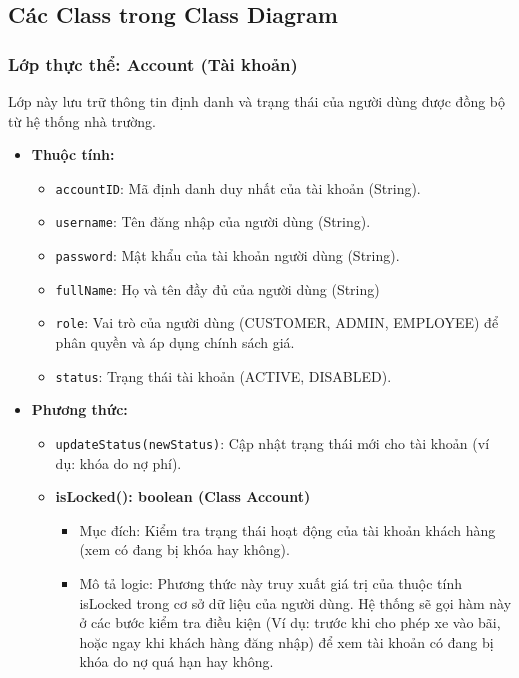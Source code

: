 \subsection{Các Class trong Class Diagram}
\subsubsection{Lớp thực thể: Account (Tài khoản)}
Lớp này lưu trữ thông tin định danh và trạng thái của người dùng được đồng bộ từ hệ thống nhà trường.

\begin{itemize}
    \item \textbf{Thuộc tính:}
    \begin{itemize}
        \item \texttt{accountID}: Mã định danh duy nhất của tài khoản (String).
        \item \texttt{username}: Tên đăng nhập của người dùng (String).
        \item \texttt{password}: Mật khẩu của tài khoản người dùng (String).
        \item \texttt{fullName}: Họ và tên đầy đủ của người dùng (String)
        \item \texttt{role}: Vai trò của người dùng (CUSTOMER, ADMIN, EMPLOYEE) để phân quyền và áp dụng chính sách giá.
        \item \texttt{status}: Trạng thái tài khoản (ACTIVE, DISABLED).
    \end{itemize}
    \item \textbf{Phương thức:}
    \begin{itemize}
        \item \texttt{updateStatus(newStatus)}: Cập nhật trạng thái mới cho tài khoản (ví dụ: khóa do nợ phí).
        \item \textbf{isLocked(): boolean (Class Account)}
        \begin{itemize}
            \item Mục đích: Kiểm tra trạng thái hoạt động của tài khoản khách hàng (xem có đang bị khóa hay không).
            \item Mô tả logic: Phương thức này truy xuất giá trị của thuộc tính isLocked trong cơ sở dữ liệu của người dùng. Hệ thống sẽ gọi hàm này ở các bước kiểm tra điều kiện (Ví dụ: trước khi cho phép xe vào bãi, hoặc ngay khi khách hàng đăng nhập) để xem tài khoản có đang bị khóa do nợ quá hạn hay không.
        \end{itemize}
    \end{itemize}
\end{itemize}

